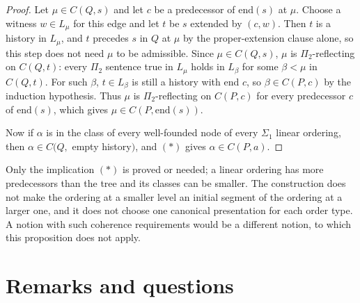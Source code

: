 \documentclass[11pt]{article}
\begin{document}
\begin{proof}
Let $\mu \in C(Q, s)$ and let $c$ be a predecessor of $\mathrm{end}(s)$ at $\mu$. Choose a witness $w \in L_{\mu}$ for
this edge and let $t$ be $s$ extended by $(c, w)$. Then $t$ is a history in $L_{\mu}$, and $t$ precedes $s$ in $Q$ at
$\mu$ by the proper-extension clause alone, so this step does not need $\mu$ to be admissible. Since
$\mu \in C(Q, s)$, $\mu$ is $\Pi_2$-reflecting on $C(Q, t)$: every $\Pi_2$ sentence true in $L_{\mu}$ holds in
$L_{\beta}$ for some $\beta < \mu$ in $C(Q, t)$. For such $\beta$, $t \in L_{\beta}$ is still a history with end $c$, so
$\beta \in C(P, c)$ by the induction hypothesis. Thus $\mu$ is $\Pi_2$-reflecting on $C(P, c)$ for every predecessor
$c$ of $\mathrm{end}(s)$, which gives $\mu \in C(P, \mathrm{end}(s))$.

Now if $\alpha$ is in the class of every well-founded node of every $\Sigma_1$ linear ordering, then
$\alpha \in C(Q,$ empty history$)$, and $(\ast)$ gives $\alpha \in C(P, a)$.
\end{proof}

Only the implication $(\ast)$ is proved or needed; a linear ordering has more predecessors than the tree and its
classes can be smaller. The construction does not make the ordering at a smaller level an initial segment of the
ordering at a larger one, and it does not choose one canonical presentation for each order type. A notion with such
coherence requirements would be a different notion, to which this proposition does not apply.

\section{Remarks and questions}
\end{document}

